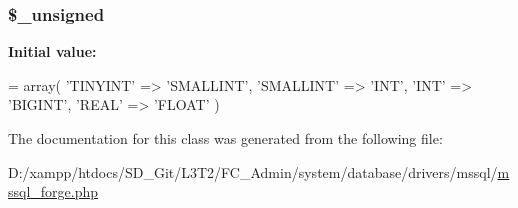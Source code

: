 \subsubsection[{\$\+\_\+unsigned}]{\setlength{\rightskip}{0pt plus 5cm}\$\+\_\+unsigned\hspace{0.3cm}{\ttfamily [protected]}}\label{class_c_i___d_b__mssql__forge_aae977ae6d61fa183f0b25422b6ddc31c}
{\bfseries Initial value\+:}
\begin{DoxyCode}
= array(
        \textcolor{stringliteral}{'TINYINT'}   => \textcolor{stringliteral}{'SMALLINT'},
        \textcolor{stringliteral}{'SMALLINT'}  => \textcolor{stringliteral}{'INT'},
        \textcolor{stringliteral}{'INT'}       => \textcolor{stringliteral}{'BIGINT'},
        \textcolor{stringliteral}{'REAL'}      => \textcolor{stringliteral}{'FLOAT'}
    )
\end{DoxyCode}


The documentation for this class was generated from the following file\+:\begin{DoxyCompactItemize}
\item 
D\+:/xampp/htdocs/\+S\+D\+\_\+\+Git/\+L3\+T2/\+F\+C\+\_\+\+Admin/system/database/drivers/mssql/\hyperlink{mssql__forge_8php}{mssql\+\_\+forge.\+php}\end{DoxyCompactItemize}
